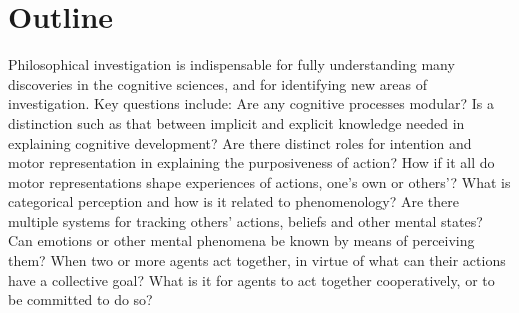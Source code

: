 \documentclass[12pt,\papersize]{extarticle}
\date{}
\begin{document}
\setlength\footnotesep{1em}


%



\maketitle

\setcounter{secnumdepth}{-1}



\section{Outline}
Philosophical investigation is indispensable for fully understanding many discoveries in the cognitive sciences, and for identifying new areas of investigation. Key questions include: Are any cognitive processes modular? Is a distinction such as that between implicit and explicit knowledge needed in explaining cognitive development? Are there distinct roles for intention and motor representation in explaining the purposiveness of action? How if it all do motor representations shape experiences of actions, one’s own or others’? What is categorical perception and how is it related to phenomenology? Are there multiple systems for tracking others’ actions, beliefs and other mental states? Can emotions or other mental phenomena be known by means of perceiving them? When two or more agents act together, in virtue of what can their actions have a collective goal? What is it for agents to act together cooperatively, or to be committed to do so?
\end{document}
